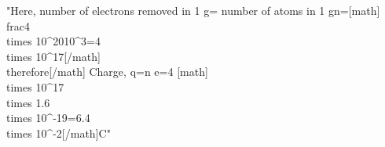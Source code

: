 "Here, number of electrons removed in 1 g\n= number of atoms in 1 g\nor n=[math]\\frac{4 \\times 10^{20}}{10^{3}}=4 \\times 10^{17}[/math]\n[math]\\therefore[/math] Charge, q=n e=4 [math]\\times 10^{17} \\times 1.6 \\times 10^{-19}=6.4 \\times 10^{-2}[/math]C"
